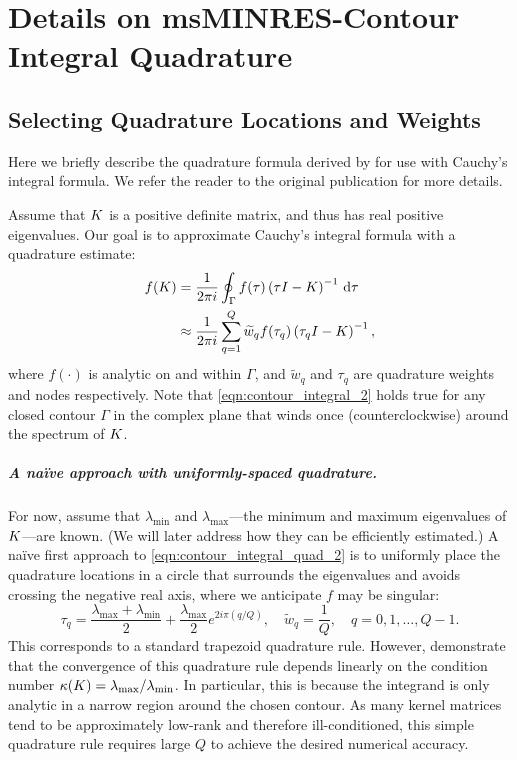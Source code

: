 \chapter{Details on msMINRES-Contour Integral Quadrature}
\label{app:quadrature}

\section{Selecting Quadrature Locations and Weights}
Here we briefly describe the quadrature formula derived by \citet{hale2008computing} for use with Cauchy's integral formula.
We refer the reader to the original publication for more details.

Assume that $K$ is a positive definite matrix, and thus has real positive eigenvalues.
Our goal is to approximate Cauchy's integral formula with a quadrature estimate:
%
\begin{align}
	f(K)
  &= \frac{1}{2 \pi i} \oint_\Gamma f(\tau) \left( \tau I - K \right)^{-1} \,\mathrm{d}{\tau}
  \label{eqn:contour_integral_2}
  \\
  &\approx
  \frac{1}{2 \pi i} \sum_{q=1}^Q \widetilde w_q f(\tau_q) \left( \tau_q I - K \right)^{-1},
  \label{eqn:contour_integral_quad_2}
\end{align}
%
where $f(\cdot)$ is analytic on and within $\Gamma$, and $\widetilde w_q$ and $\tau_q$ are quadrature weights and nodes respectively.
Note that \cref{eqn:contour_integral_2} holds true for any closed contour $\Gamma$ in the complex plane that winds once (counterclockwise) around the spectrum of $K$.

\paragraph{A na\"ive approach with uniformly-spaced quadrature.}
For now, assume that $\lambda_\text{min}$ and $\lambda_\text{max}$---the minimum and maximum eigenvalues of $K$---are known.
(We will later address how they can be efficiently estimated.)
A na\"ive first approach to \cref{eqn:contour_integral_quad_2} is to uniformly place the quadrature locations in a circle that surrounds the eigenvalues and avoids crossing the negative real axis, where we anticipate $f$ may be singular:
%
\[
  \tau_q = \frac{\lambda_{\max}+\lambda_{\min}}{2} + \frac{\lambda_{\max}}{2}e^{2 i \pi \left( q / Q \right)},
  \quad
  \widetilde w_q = \frac 1 Q, \quad q=0,1,\ldots,Q-1.
\]
%
This corresponds to a standard trapezoid quadrature rule. However, \citet{hale2008computing} demonstrate that the convergence of this quadrature rule depends linearly on the condition number $\kappa(K) = \lambda_\text{max} / \lambda_\text{min}$. In particular, this is because the integrand is only analytic in a narrow region around the chosen contour. As many kernel matrices tend to be approximately low-rank and therefore ill-conditioned, this simple quadrature rule requires large $Q$ to achieve the desired numerical accuracy.

